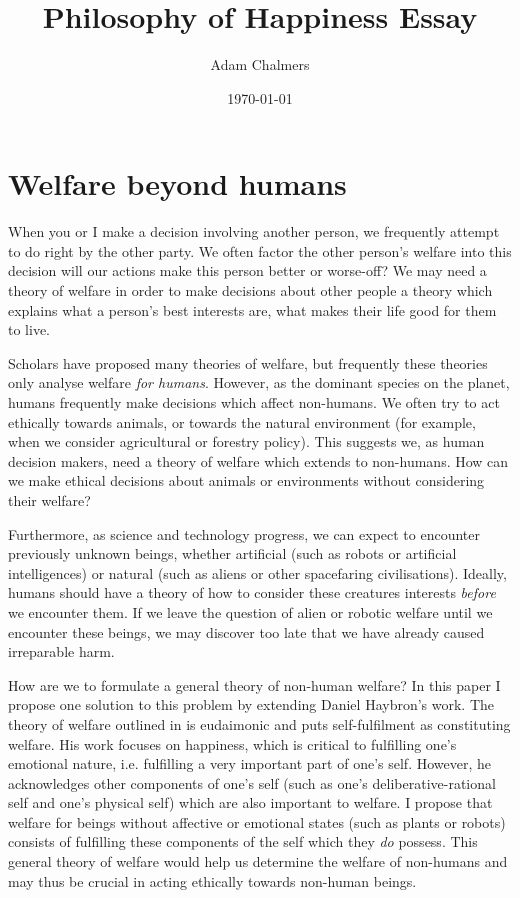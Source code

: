 \documentclass{article}
\title{Philosophy of Happiness Essay}
\author{Adam Chalmers}
\date{\today}
\begin{document}
\frenchspacing
\onehalfspacing
\maketitle


\section{Welfare beyond humans}

When you or I make a decision involving another person, we frequently attempt to do right by the other party. We often factor the other person's welfare into this decision \textemdash{} will our actions make this person better or worse-off? We may need a theory of welfare in order to make decisions about other people \textemdash{} a theory which explains what a person's best interests are, what makes their life good for them to live.

Scholars have proposed many theories of welfare, but frequently these theories only analyse welfare \textit{for humans}. However, as the dominant species on the planet, humans frequently make decisions which affect non-humans. We often try to act ethically towards animals, or towards the natural environment (for example, when we consider agricultural or forestry policy). This suggests we, as human decision makers, need a theory of welfare which extends to non-humans. How can we make ethical decisions about animals or environments without considering their welfare? 

Furthermore, as science and technology progress, we can expect to encounter previously unknown beings, whether artificial (such as robots or artificial intelligences) or natural (such as aliens or other spacefaring civilisations). Ideally, humans should have a theory of how to consider these creatures interests \textit{before} we encounter them. If we leave the question of alien or robotic welfare until we encounter these beings, we may discover too late that we have already caused irreparable harm.

How are we to formulate a general theory of non-human welfare? In this paper I propose one solution to this problem by extending Daniel Haybron's work. The theory of welfare outlined in \citet{haybron2008pursuit} is eudaimonic and puts self-fulfilment as constituting welfare. His work focuses on happiness, which is critical to fulfilling one's emotional nature, i.e. fulfilling a very important part of one's self. However, he acknowledges other components of one's self (such as one's deliberative-rational self and one's physical self) which are also important to welfare. I propose that welfare for beings without affective or emotional states (such as plants or robots) consists of fulfilling these components of the self which they \textit{do} possess. This general theory of welfare would help us determine the welfare of non-humans and may thus be crucial in acting ethically towards non-human beings.
\end{document}
